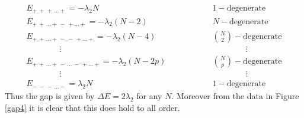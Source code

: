 \documentclass[aps,pra,superscriptaddress]{revtex4}
\renewcommand{\(}{\left(}
\renewcommand{\)}{\right)}
\renewcommand{\[}{\left[}
\renewcommand{\]}{\right]}
\begin{document}
\begin{align*}
 & E_{ + \, + \, + \, \dots + } = -\lambda_2 N  & \qquad    \qquad &  1-\mathrm{degenerate} & \\[2.5mm]
 & E_{ + \, + \, \dots  + \, - \, + \dots + } = -\lambda_2 (N-2)  & \qquad  \qquad & N-\mathrm{degenerate} & \\[1mm]
 & E_{ + \, + \, \dots  + \, - \, - \, + \dots + } = -\lambda_2 (N-4)  & \qquad  \qquad &  \binom{N}{2}-\mathrm{degenerate} & \\
 &  \qquad \qquad \vdots &  &  \qquad  \qquad  \vdots  & \\
 & E_{ + \, + \, \dots  + \, -  \, \dots \, - \, + \dots + } = -\lambda_2 (N-2 p)&  \qquad   \qquad & \binom{N}{p}-\mathrm{degenerate} & \\
 &  \qquad \qquad \vdots &  &  \qquad  \qquad  \vdots  & \\[1.5mm]
 & E_{ - \, - \, - \, \dots - } = \lambda_2 N  & \qquad    \qquad &  1-\mathrm{degenerate} & 
\end{align*}
Thus the gap is given by $\Delta E = 2 \lambda_2$ for any $N$. Moreover from the data in Figure \ref{gap4} it is clear that this does hold to all order.
\end{document}
